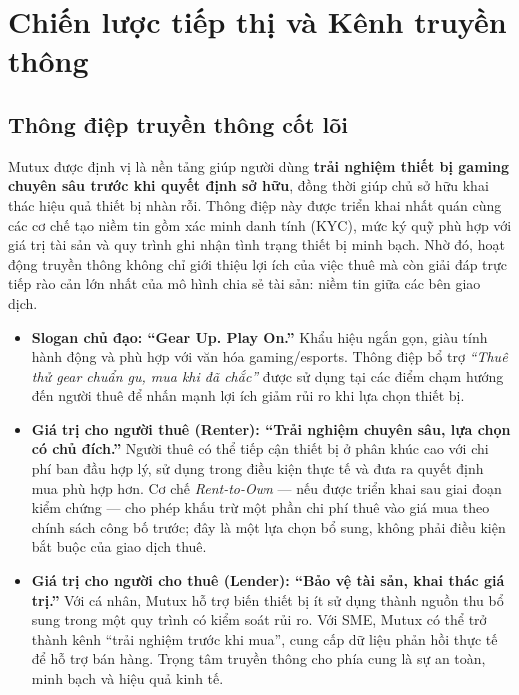\section{Chiến lược tiếp thị và Kênh truyền thông}

\subsection{Thông điệp truyền thông cốt lõi}

Mutux được định vị là nền tảng giúp người dùng \textbf{trải nghiệm thiết bị gaming chuyên sâu trước khi quyết định sở hữu}, đồng thời giúp chủ sở hữu khai thác hiệu quả thiết bị nhàn rỗi. Thông điệp này được triển khai nhất quán cùng các cơ chế tạo niềm tin gồm xác minh danh tính (KYC), mức ký quỹ phù hợp với giá trị tài sản và quy trình ghi nhận tình trạng thiết bị minh bạch. Nhờ đó, hoạt động truyền thông không chỉ giới thiệu lợi ích của việc thuê mà còn giải đáp trực tiếp rào cản lớn nhất của mô hình chia sẻ tài sản: niềm tin giữa các bên giao dịch.

\begin{itemize}
    \item \textbf{Slogan chủ đạo: ``Gear Up. Play On.''} Khẩu hiệu ngắn gọn, giàu tính hành động và phù hợp với văn hóa gaming/esports. Thông điệp bổ trợ \textit{``Thuê thử gear chuẩn gu, mua khi đã chắc''} được sử dụng tại các điểm chạm hướng đến người thuê để nhấn mạnh lợi ích giảm rủi ro khi lựa chọn thiết bị.

    \item \textbf{Giá trị cho người thuê (Renter): ``Trải nghiệm chuyên sâu, lựa chọn có chủ đích.''} Người thuê có thể tiếp cận thiết bị ở phân khúc cao với chi phí ban đầu hợp lý, sử dụng trong điều kiện thực tế và đưa ra quyết định mua phù hợp hơn. Cơ chế \textit{Rent-to-Own} --- nếu được triển khai sau giai đoạn kiểm chứng --- cho phép khấu trừ một phần chi phí thuê vào giá mua theo chính sách công bố trước; đây là một lựa chọn bổ sung, không phải điều kiện bắt buộc của giao dịch thuê.

    \item \textbf{Giá trị cho người cho thuê (Lender): ``Bảo vệ tài sản, khai thác giá trị.''} Với cá nhân, Mutux hỗ trợ biến thiết bị ít sử dụng thành nguồn thu bổ sung trong một quy trình có kiểm soát rủi ro. Với SME, Mutux có thể trở thành kênh ``trải nghiệm trước khi mua'', cung cấp dữ liệu phản hồi thực tế để hỗ trợ bán hàng. Trọng tâm truyền thông cho phía cung là sự an toàn, minh bạch và hiệu quả kinh tế.
\end{itemize}

